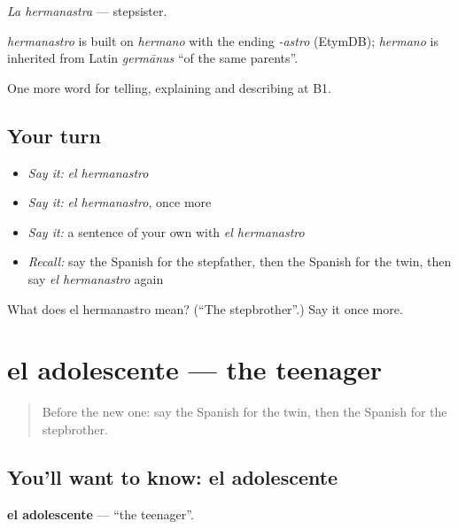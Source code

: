\emph{La hermanastra} — stepsister.

\begin{cousinweb}
\emph{hermanastro} is built on \emph{hermano} with the ending \emph{-astro} (EtymDB); \emph{hermano} is inherited from Latin \emph{germānus} \textquotedblleft{}of the same parents\textquotedblright{}.
\end{cousinweb}

\begin{grammarlens}[title={What you've built}]
One more word for telling, explaining and describing at B1.
\end{grammarlens}

\subsection*{Your turn}
\begin{itemize}
\raggedright
  \item \emph{Say it:} \emph{el hermanastro}
  \item \emph{Say it:} \emph{el hermanastro}, once more
  \item \emph{Say it:} a sentence of your own with \emph{el hermanastro}
  \item \emph{Recall:} say the Spanish for the stepfather, then the Spanish for the twin, then say \emph{el hermanastro} again
\end{itemize}

\begin{tcolorbox}[breakable,colback=teal!4,colframe=teal!35!black,title={Before you move on}]
What does el hermanastro mean? (\textquotedblleft{}The stepbrother\textquotedblright{}.) Say it once more.
\end{tcolorbox}
\section[el adolescente]{el adolescente — the teenager}

\label{lesson:ES-C749-adolescente}



\begin{quote}
Before the new one: say the Spanish for the twin, then the Spanish for the stepbrother.
\end{quote}

\subsection*{You'll want to know: el adolescente}
\textbf{el adolescente} — \textquotedblleft{}the teenager\textquotedblright{}.

